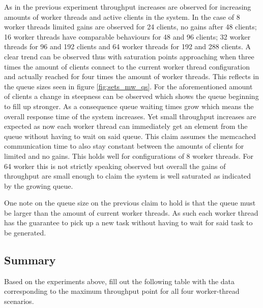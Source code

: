             As in the previous experiment throughput increases are observed for increasing amounts of worker threads and
            active clients in the system. In the case of 8 worker threads limited gains are observed for 24 clients, no
            gains after 48 clients; 16 worker threads have comparable behaviours for 48 and 96 clients; 32 worker
            threads for 96 and 192 clients and 64 worker threads for 192 and 288 clients. A clear trend can be observed
            thus with saturation points approaching when three times the amount of clients connect to the current
            worker thread configuration and actually reached for four times the amount of worker threads. This reflects
            in the queue sizes seen in figure \ref{fig:sets_mw_qs}. For the aforementioned amount of clients a change in
            steepness can be observed which shows the queue beginning to fill up stronger. As a consequence queue
            waiting times grow which means the overall response time of the system increases. Yet small throughput
            increases are expected as now each worker thread can immediately get an element from the queue without
            having to wait on said queue. This claim assumes the memcached communication time to also stay constant
            between the amounts of clients for limited and no gains. This holds well for configurations of 8 worker threads. For 64 worker this is not strictly speaking observed but overall the gains of throughput
            are small enough to claim the system is well saturated as indicated by the growing queue.

            One note on the queue size on the previous claim to hold is that the queue must be larger than the amount of
            current worker threads. As such each worker thread has the guarantee to pick up a new task without having
            to wait for said task to be generated.

    \subsection{Summary\label{subsec:4_summary}}

        Based on the experiments above, fill out the following table with the data corresponding to the maximum throughput point for all four worker-thread scenarios.

